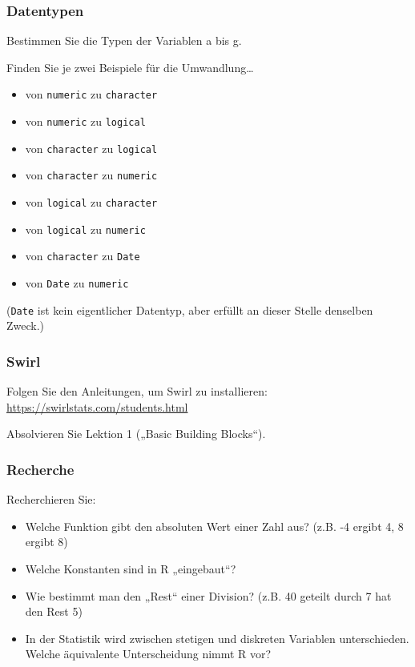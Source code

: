 \documentclass[
  ngerman,
]{article}
\providecommand{\tightlist}{%
  \setlength{\itemsep}{0pt}\setlength{\parskip}{0pt}}
\begin{document}
\hypertarget{datentypen-1}{%
\subsubsection{Datentypen}\label{datentypen-1}}

Bestimmen Sie die Typen der Variablen a bis g.

Finden Sie je zwei Beispiele für die Umwandlung\ldots{}

\begin{itemize}
\tightlist
\item
  von \texttt{numeric} zu \texttt{character}
\item
  von \texttt{numeric} zu \texttt{logical}
\item
  von \texttt{character} zu \texttt{logical}
\item
  von \texttt{character} zu \texttt{numeric}
\item
  von \texttt{logical} zu \texttt{character}
\item
  von \texttt{logical} zu \texttt{numeric}
\item
  von \texttt{character} zu \texttt{Date}
\item
  von \texttt{Date} zu \texttt{numeric}
\end{itemize}

(\texttt{Date} ist kein eigentlicher Datentyp, aber erfüllt an dieser Stelle denselben Zweck.)

\hypertarget{swirl}{%
\subsubsection{Swirl}\label{swirl}}

Folgen Sie den Anleitungen, um Swirl zu installieren: \url{https://swirlstats.com/students.html}

Absolvieren Sie Lektion 1 („Basic Building Blocks``).

\hypertarget{recherche}{%
\subsubsection{Recherche}\label{recherche}}

Recherchieren Sie:

\begin{itemize}
\tightlist
\item
  Welche Funktion gibt den absoluten Wert einer Zahl aus? (z.B. -4 ergibt 4, 8 ergibt 8)
\item
  Welche Konstanten sind in R „eingebaut``?
\item
  Wie bestimmt man den „Rest`` einer Division? (z.B. 40 geteilt durch 7 hat den Rest 5)
\item
  In der Statistik wird zwischen stetigen und diskreten Variablen unterschieden. Welche äquivalente Unterscheidung nimmt R vor?
\end{itemize}
\end{document}
